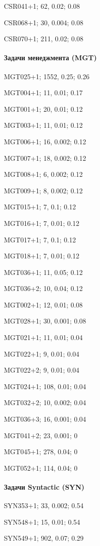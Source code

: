 CSR041+1; 62, 0.02; 0.08

CSR068+1; 30, 0.004; 0.08

CSR070+1; 211, 0.02; 0.08

\paragraph{Задачи менеджмента (MGT)}

MGT025+1; 1552, 0.25; 0.26

MGT004+1; 11, 0.01; 0.17

MGT001+1; 20, 0.01; 0.12

MGT003+1; 11, 0.01; 0.12

MGT006+1; 16, 0.002; 0.12

MGT007+1; 18, 0.002; 0.12

MGT008+1; 6, 0.002; 0.12

MGT009+1; 8, 0.002; 0.12

MGT015+1; 7, 0.1; 0.12

MGT016+1; 7, 0.01; 0.12

MGT017+1; 7, 0.1; 0.12

MGT018+1; 7, 0.01; 0.12

MGT036+1; 11, 0.05; 0.12

MGT036+2; 10, 0.04; 0.12

MGT002+1; 12, 0.01; 0.08

MGT028+1; 30, 0.001; 0.08

MGT021+1; 11, 0.01; 0.04

MGT022+1; 9, 0.01; 0.04

MGT022+2; 9, 0.01; 0.04

MGT024+1; 108, 0.01; 0.04

MGT032+2; 10, 0.002; 0.04

MGT036+3; 16, 0.001; 0.04



MGT041+2; 23, 0.001; 0

MGT045+1; 278, 0.04; 0

MGT052+1; 114, 0.04; 0


\paragraph{Задачи Syntactic (SYN)}

SYN353+1; 33, 0.002; 0.54

SYN548+1; 15, 0.01; 0.54

SYN549+1; 902, 0.07; 0.29

